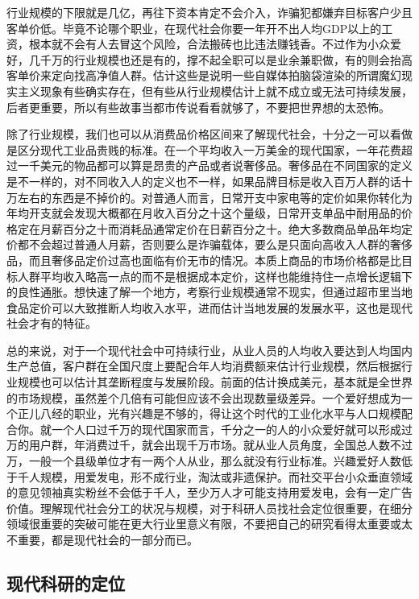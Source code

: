 \documentclass[]{tufte-book}
\begin{document}
行业规模的下限就是几亿，再往下资本肯定不会介入，诈骗犯都嫌弃目标客户少且客单价低。毕竟不论哪个职业，在现代社会你要一年开不出人均GDP以上的工资，根本就不会有人去冒这个风险，合法搬砖也比违法赚钱香。不过作为小众爱好，几千万的行业规模也还是有的，撑不起全职可以是业余兼职做，有的则会抬高客单价来定向找高净值人群。估计这些是说明一些自媒体拍脑袋渲染的所谓魔幻现实主义现象有些确实存在，但有些从行业规模估计上就不成立或无法可持续发展，后者更重要，所以有些故事当都市传说看看就够了，不要把世界想的太恐怖。

除了行业规模，我们也可以从消费品价格区间来了解现代社会，十分之一可以看做是区分现代工业品贵贱的标准。在一个平均收入一万美金的现代国家，一年花费超过一千美元的物品都可以算是昂贵的产品或者说奢侈品。奢侈品在不同国家的定义是不一样的，对不同收入人的定义也不一样，如果品牌目标是收入百万人群的话十万左右的东西是不掉价的。对普通人而言，日常开支中家电等的定价如果你转化为年均开支就会发现大概都在月收入百分之十这个量级，日常开支单品中耐用品的价格定在月薪百分之十而消耗品通常定价在日薪百分之十。绝大多数商品单品年均定价都不会超过普通人月薪，否则要么是诈骗载体，要么是只面向高收入人群的奢侈品，而且奢侈品定价过高也面临有价无市的情况。本质上商品的市场价格都是比目标人群平均收入略高一点的而不是根据成本定价，这样也能维持住一点增长逻辑下的良性通胀。想快速了解一个地方，考察行业规模通常不现实，但通过超市里当地食品定价可以大致推断人均收入水平，进而估计当地发展的发展水平，这也是现代社会才有的特征。

总的来说，对于一个现代社会中可持续行业，从业人员的人均收入要达到人均国内生产总值，客户群在全国尺度上要配合年人均消费额来估计行业规模，然后根据行业规模也可以估计其垄断程度与发展阶段。前面的估计换成美元，基本就是全世界的市场规模，虽然差个几倍有可能但应该不会出现数量级差异。一个爱好想成为一个正儿八经的职业，光有兴趣是不够的，得让这个时代的工业化水平与人口规模配合你。就一个人口过千万的现代国家而言，千分之一的人的小众爱好就可以形成过万的用户群，年消费过千，就会出现千万市场。就从业人员角度，全国总人数不过万，一般一个县级单位才有一两个人从业，那么就没有行业标准。兴趣爱好人数低于千人规模，用爱发电，形不成行业，淘汰或非遗保护。而社交平台小众垂直领域的意见领袖真实粉丝不会低于千人，至少万人才可能支持用爱发电，会有一定广告价值。理解现代社会分工的状况与规模，对于科研人员找社会定位很重要，在细分领域很重要的突破可能在更大行业里意义有限，不要把自己的研究看得太重要或太不重要，都是现代社会的一部分而已。

\hypertarget{ux73b0ux4ee3ux79d1ux7814ux7684ux5b9aux4f4d}{%
\subsection{现代科研的定位}\label{ux73b0ux4ee3ux79d1ux7814ux7684ux5b9aux4f4d}}
\end{document}
